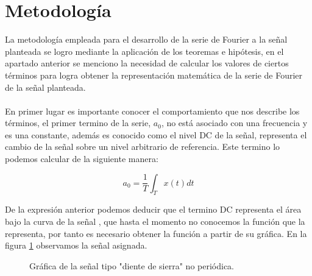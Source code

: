 \documentclass[7pt]{article}
\begin{document}
\section*{Metodología}
    La metodología empleada para el desarrollo de la serie de Fourier a la señal planteada se 
    logro mediante la aplicación de los teoremas e hipótesis, en el apartado anterior se menciono 
    la necesidad de calcular los valores de ciertos términos para logra obtener la representación 
    matemática de la serie de Fourier de la señal planteada.\\ 
    \\
    En primer lugar es importante conocer el comportamiento que nos describe los términos, el primer 
    termino de la serie, $a_{0}$, no está asociado con una frecuencia y es una constante, además es 
    conocido como el nivel DC de la señal, representa el cambio de la señal sobre un nivel arbitrario 
    de referencia. Este termino lo podemos calcular de la siguiente manera:

    \begin{equation}
        a_{0}=\frac{1}{T} \int_{T}^{} x(t)dt
        \label{equation2}
    \end{equation}
    
    De la expresión anterior podemos deducir que el termino DC representa el área bajo la curva de la 
    señal \cite{diapositivas}, que hasta el momento no conocemos la función que la representa, por tanto es necesario obtener 
    la función a partir de su gráfica. En la figura \ref{funcionAsiganda} observamos la señal asignada.

    \begin{figure}[H]
        \centering
        \caption{Gráfica de la señal tipo "diente de sierra" no periódica.}
        \label{funcionAsiganda}
    \end{figure}
\end{document}
